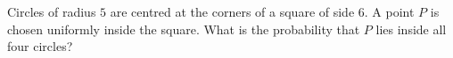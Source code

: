Circles of radius $5$ are centred at the corners of a square of side $6$. A point $P$ is chosen uniformly inside the square. What is the probability that $P$ lies inside all four circles?

